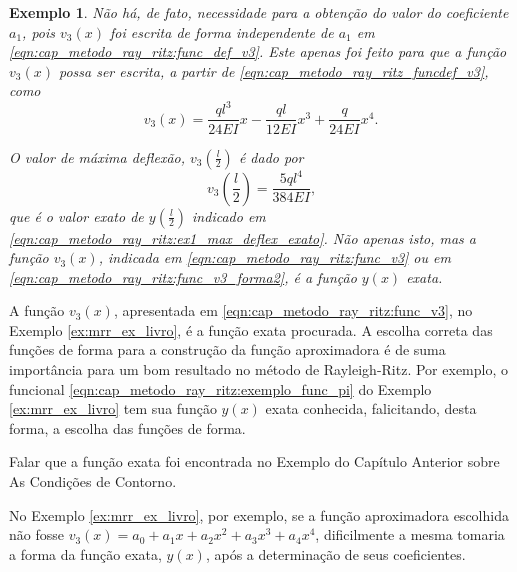 \documentclass[
	12pt,				%
	openright,			%
    twoside,			%
	a4paper,			%
	english,			%
	french,				%
	spanish,			%
	brazil				%
	]{abntex2}
\newtheorem{exemplo}{Exemplo}
\numberwithin{lema}{chapter}
\numberwithin{teorema}{chapter}
\numberwithin{definicao}{chapter}
\numberwithin{exemplo}{chapter}
\numberwithin{figure}{chapter}
\begin{document}
\begin{exemplo}
	Não há, de fato, necessidade para a obtenção do valor do coeficiente $a_1$, pois $v_3(x)$ foi escrita de forma independente de $a_1$ em \eqref{eqn:cap_metodo_ray_ritz:func_def_v3}. Este apenas foi feito para que a função $v_3(x)$ possa ser escrita, a partir de \eqref{eqn:cap_metodo_ray_ritz_funcdef_v3}, como
	\begin{equation}
		\label{eqn:cap_metodo_ray_ritz:func_v3_forma2}
		v_3(x)=
			\frac{ql^3}{24EI} x
			-
			\frac{ql}{12EI} x^3
			+
			\frac{q}{24EI} x^4
		\text{.}
	\end{equation}


	O valor de máxima deflexão, $v_3(\frac{l}{2})$ é dado por
	$$
		v_3(\frac{l}{2})=\frac{5ql^4}{384EI}
		\text{,}
	$$
	que é o valor exato de $y(\frac{l}{2})$ indicado em \eqref{eqn:cap_metodo_ray_ritz:ex1_max_deflex_exato}. Não apenas isto, mas a função $v_3(x)$, indicada em \eqref{eqn:cap_metodo_ray_ritz:func_v3} ou em \eqref{eqn:cap_metodo_ray_ritz:func_v3_forma2}, é a função $y(x)$ exata.
	
	
\end{exemplo}

A função $v_3(x)$, apresentada em \eqref{eqn:cap_metodo_ray_ritz:func_v3}, no Exemplo \ref{ex:mrr_ex_livro}, é a função exata procurada. A escolha correta das funções de forma para a construção da função aproximadora é de suma importância para um bom resultado no método de Rayleigh-Ritz. Por exemplo, o funcional \eqref{eqn:cap_metodo_ray_ritz:exemplo_func_pi} do Exemplo \ref{ex:mrr_ex_livro} tem sua função $y(x)$ exata conhecida, falicitando, desta forma, a escolha das funções de forma.

{\color{red}Falar que a função exata foi encontrada no Exemplo do Capítulo Anterior sobre As Condições de Contorno.}

No Exemplo \ref{ex:mrr_ex_livro}, por exemplo, se a função aproximadora escolhida não fosse $v_3(x)=a_0+a_1x+a_2x^2+a_3x^3+a_4x^4$, dificilmente a mesma tomaria a forma da função exata, $y(x)$, após a determinação de seus coeficientes.
\end{document}
